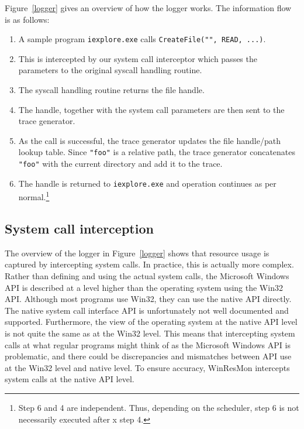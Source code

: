 Figure~\ref{logger} gives an overview of how the logger works.
The information flow is as follows:

\begin{enumerate}
\item A sample program {\small\tt iexplore.exe} calls
{\small\tt CreateFile("", READ, ...)}.
\item This is intercepted by our system call interceptor
which passes the parameters to the original syscall handling routine.
\item The syscall handling routine returns the file handle.
\item The handle, together with the system call parameters are then sent to
the trace generator.
\item As the call is successful, the trace generator updates 
the file handle/path lookup table.
Since {\small\tt "foo"} is a relative path, the trace generator concatenates
{\small\tt "foo"} with the current directory and add it to the trace.
\item The handle is returned to {\small\tt iexplore.exe} and operation
continues as per normal.\footnote{Step 6 and 4 are independent.
Thus, depending on the scheduler, step 6 is not necessarily executed after
x
step 4.} 
\end{enumerate}


\subsection{System call interception}

The overview of the logger in Figure~\ref{logger} shows that resource usage is
captured by intercepting system calls.  In practice, this is actually more
complex.  Rather than defining and using the actual system calls, the
Microsoft Windows API is described at a level higher than the operating system
using the Win32 API.  Although most programs use Win32, they can use the
native API \cite{ntnativeapi} directly.  The native system call interface API
is unfortunately not well documented and supported.  Furthermore, the view of
the operating system at the native API level is not quite the same as at the
Win32 level.  This means that intercepting system calls at what regular
programs might think of as the Microsoft Windows API is problematic, and there
could be discrepancies and mismatches between API use at the Win32 level and
native level.  To ensure accuracy, WinResMon intercepts system calls at the
native API level.

